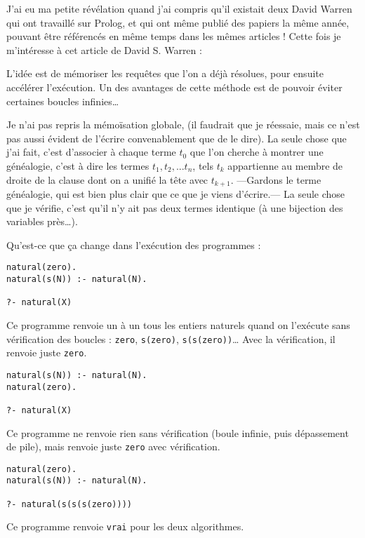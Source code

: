 \documentclass{article}
\begin{document}
J'ai eu ma petite révélation quand j'ai compris qu'il existait deux David Warren qui ont travaillé sur Prolog, et qui ont même publié des papiers la même année, pouvant être référencés en même temps dans les mêmes articles ! Cette fois je m'intéresse à cet article de David S. Warren : \cite{Warren}

L'idée est de mémoriser les requêtes que l'on a déjà résolues, pour ensuite accélérer l'exécution. Un des avantages de cette méthode est de pouvoir éviter certaines boucles infinies\ldots{}

Je n'ai pas repris la mémoïsation globale, (il faudrait que je réessaie, mais ce n'est pas aussi évident de l'écrire convenablement que de le dire). La seule chose que j'ai fait, c'est d'associer à chaque terme \(t_0\) que l'on cherche à montrer une généalogie, c'est à dire les termes \(t_1, t_2, ... t_n\), tels \(t_k\) appartienne au membre de droite de la clause dont on a unifié la tête avec \(t_{k+1}\). ---Gardons le terme généalogie, qui est bien plus clair que ce que je viens d'écrire.--- La seule chose que je vérifie, c'est qu'il n'y ait pas deux termes identique (à une bijection des variables près\ldots).

Qu'est-ce que ça change dans l'exécution des programmes :

\begin{verbatim}
natural(zero).
natural(s(N)) :- natural(N).

?- natural(X)
\end{verbatim}

Ce programme renvoie un à un tous les entiers naturels quand on l'exécute sans vérification des boucles : \texttt{zero}, \texttt{s(zero)}, \texttt{s(s(zero))}\ldots{} Avec la vérification, il renvoie juste \texttt{zero}.

\begin{verbatim}
natural(s(N)) :- natural(N).
natural(zero).

?- natural(X)
\end{verbatim}

Ce programme ne renvoie rien sans vérification (boule infinie, puis dépassement de pile), mais renvoie juste \texttt{zero} avec vérification.

\begin{verbatim}
natural(zero).
natural(s(N)) :- natural(N).

?- natural(s(s(s(zero))))
\end{verbatim}

Ce programme renvoie \texttt{vrai} pour les deux algorithmes.
\end{document}
